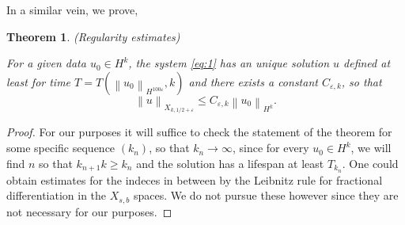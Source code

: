 \documentclass[draft,11pt,leqno]{amsart}
\newtheorem{theorem}{Theorem}
\newcommand{\norm}[2]{{\left\| #1 \right\|}_{#2}}
\newcommand{\ve}{\varepsilon}
\begin{document}
In a similar vein, we prove, 

\begin{theorem}(Regularity estimates)

For a given data $u_0\in H^k$, the system 
\eqref{eq:1} has an unique solution $u$ defined at least for time  
$T=T(\norm{u_0}{H^{100\ve}},k)$ and there exists a constant $C_{\ve,k}$, 
so that  
$$
\norm{u}{X_{k,1/2+\ve}}\leq C_{\ve,k}\norm{u_0}{H^k}.
$$
\end{theorem}

\begin{proof}
For our purposes it will suffice to check the statement of the theorem for
some specific sequence $(k_n)$, so that $k_n\to\infty$, since for every 
$u_0\in H^k$, we will find $n$ so that $k_{n+1}k\geq k_n$ and the solution 
has a lifespan at least $T_{k_n}$. One could obtain estimates for the
indeces in between by the Leibnitz rule for fractional differentiation
in the $X_{s,b}$ spaces. We do not pursue these however since they are not
necessary for our purposes.  


\end{proof}
\end{document}
